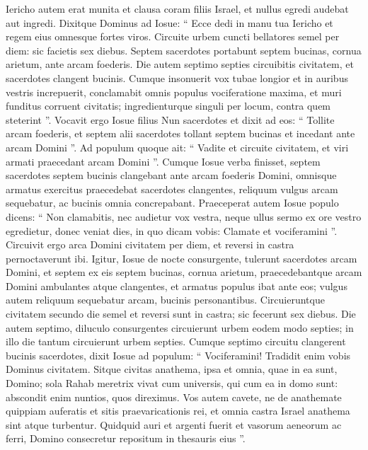 \begin{biblechapter}
\begin{biblechapter}
\begin{biblechapter}
\begin{biblechapter}
\begin{biblechapter}
\begin{biblechapter}
\verse Iericho autem erat munita et clausa coram filiis Israel, et nullus egredi audebat aut ingredi.
 \verse Dixitque Dominus ad Iosue: “ Ecce dedi in manu tua Iericho et regem eius omnesque fortes viros. 
\verse Circuite urbem cuncti bellatores semel per diem: sic facietis sex diebus. 
\verse Septem sacerdotes portabunt septem bucinas, cornua arietum, ante arcam foederis. Die autem septimo septies circuibitis civitatem, et sacerdotes clangent bucinis. 
\verse Cumque insonuerit vox tubae longior et in auribus vestris increpuerit, conclamabit omnis populus vociferatione maxima, et muri funditus corruent civitatis; ingredienturque singuli per locum, contra quem steterint ”.
 \verse Vocavit ergo Iosue filius Nun sacerdotes et dixit ad eos: “ Tollite arcam foederis, et septem alii sacerdotes tollant septem bucinas et incedant ante arcam Domini ”. 
\verse Ad populum quoque ait: “ Vadite et circuite civitatem, et viri armati praecedant arcam Domini ”.
 \verse Cumque Iosue verba finisset, septem sacerdotes septem bucinis clangebant ante arcam foederis Domini, 
\verse omnisque armatus exercitus praecedebat sacerdotes clangentes, reliquum vulgus arcam sequebatur, ac bucinis omnia concrepabant. 
 \verse Praeceperat autem Iosue populo dicens: “ Non clamabitis, nec audietur vox vestra, neque ullus sermo ex ore vestro egredietur, donec veniat dies, in quo dicam vobis: Clamate et vociferamini ”. 
\verse Circuivit ergo arca Domini civitatem per diem, et reversi in castra pernoctaverunt ibi.
 \verse Igitur, Iosue de nocte consurgente, tulerunt sacerdotes arcam Domini, 
\verse et septem ex eis septem bucinas, cornua arietum, praecedebantque arcam Domini ambulantes atque clangentes, et armatus populus ibat ante eos; vulgus autem reliquum sequebatur arcam, bucinis personantibus. 
\verse Circuieruntque civitatem secundo die semel et reversi sunt in castra; sic fecerunt sex diebus.
 \verse Die autem septimo, diluculo consurgentes circuierunt urbem eodem modo septies; in illo die tantum circuierunt urbem septies. 
\verse Cumque septimo circuitu clangerent bucinis sacerdotes, dixit Iosue ad populum: “ Vociferamini! Tradidit enim vobis Dominus civitatem. 
\verse Sitque civitas anathema, ipsa et omnia, quae in ea sunt, Domino; sola Rahab meretrix vivat cum universis, qui cum ea in domo sunt: abscondit enim nuntios, quos direximus. 
\verse Vos autem cavete, ne de anathemate quippiam auferatis et sitis praevaricationis rei, et omnia castra Israel anathema sint atque turbentur. 
\verse Quidquid auri et argenti fuerit et vasorum aeneorum ac ferri, Domino consecretur repositum in thesauris eius ”.

\end{biblechapter}
\end{biblechapter}
\end{biblechapter}
\end{biblechapter}
\end{biblechapter}
\end{biblechapter}
